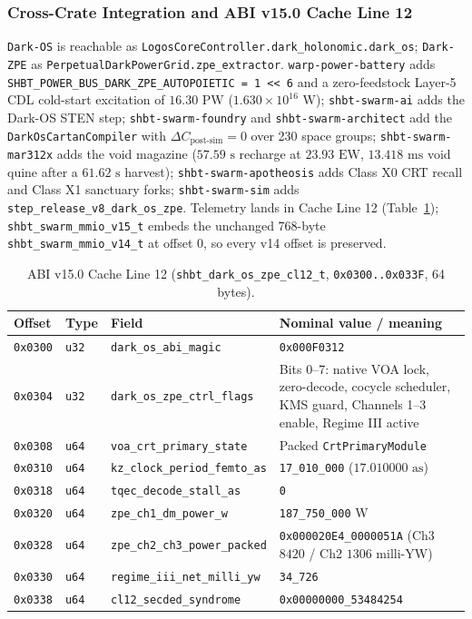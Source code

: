 \documentclass[11pt,onecolumn]{article}
\begin{document}
\subsubsection{Cross-Crate Integration and ABI v15.0 Cache Line 12}
\label{subsubsec:v8_cl12_integration}
\texttt{Dark-OS} is reachable as \texttt{LogosCoreController.dark\_holonomic.dark\_os}; \texttt{Dark-ZPE} as \texttt{PerpetualDarkPowerGrid.zpe\_extractor}. \texttt{warp-power-battery} adds \texttt{SHBT\_POWER\_BUS\_DARK\_ZPE\_AUTOPOIETIC = 1 << 6} and a zero-feedstock Layer-5 CDL cold-start excitation of $16.30\text{ PW}$ ($1.630\times10^{16}\text{ W}$); \texttt{shbt-swarm-ai} adds the Dark-OS STEN step; \texttt{shbt-swarm-foundry} and \texttt{shbt-swarm-architect} add the \texttt{DarkOsCartanCompiler} with $\Delta C_{\text{post-sim}}=0$ over 230 space groups; \texttt{shbt-swarm-mar312x} adds the void magazine ($57.59\text{ s}$ recharge at $23.93\text{ EW}$, $13.418\text{ ms}$ void quine after a $61.62\text{ s}$ harvest); \texttt{shbt-swarm-apotheosis} adds Class X0 CRT recall and Class X1 sanctuary forks; \texttt{shbt-swarm-sim} adds \texttt{step\_release\_v8\_dark\_os\_zpe}. Telemetry lands in Cache Line 12 (Table~\ref{tab:v8_cl12}); \texttt{shbt\_swarm\_mmio\_v15\_t} embeds the unchanged 768-byte \texttt{shbt\_swarm\_mmio\_v14\_t} at offset 0, so every v14 offset is preserved.

\begin{table}[!htbp]
\centering\small
\caption{ABI v15.0 Cache Line 12 (\texttt{shbt\_dark\_os\_zpe\_cl12\_t}, \texttt{0x0300..0x033F}, 64 bytes).}
\label{tab:v8_cl12}
\begin{tabularx}{\textwidth}{@{}l l l X@{}}
\toprule
Offset & Type & Field & Nominal value / meaning \\
\midrule
\texttt{0x0300} & \texttt{u32} & \texttt{dark\_os\_abi\_magic} & \texttt{0x000F0312} \\
\texttt{0x0304} & \texttt{u32} & \texttt{dark\_os\_zpe\_ctrl\_flags} & Bits 0--7: native VOA lock, zero-decode, cocycle scheduler, KMS guard, Channels 1--3 enable, Regime III active \\
\texttt{0x0308} & \texttt{u64} & \texttt{voa\_crt\_primary\_state} & Packed \texttt{CrtPrimaryModule} \\
\texttt{0x0310} & \texttt{u64} & \texttt{kz\_clock\_period\_femto\_as} & \texttt{17\_010\_000} ($17.010000\text{ as}$) \\
\texttt{0x0318} & \texttt{u64} & \texttt{tqec\_decode\_stall\_as} & \texttt{0} \\
\texttt{0x0320} & \texttt{u64} & \texttt{zpe\_ch1\_dm\_power\_w} & \texttt{187\_750\_000} W \\
\texttt{0x0328} & \texttt{u64} & \texttt{zpe\_ch2\_ch3\_power\_packed} & \texttt{0x000020E4\_0000051A} (Ch3 $8420$ / Ch2 $1306$ milli-YW) \\
\texttt{0x0330} & \texttt{u64} & \texttt{regime\_iii\_net\_milli\_yw} & \texttt{34\_726} \\
\texttt{0x0338} & \texttt{u64} & \texttt{cl12\_secded\_syndrome} & \texttt{0x00000000\_53484254} \\
\bottomrule
\end{tabularx}
\end{table}
\end{document}
